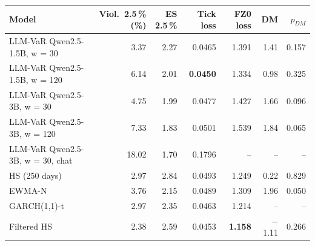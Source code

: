 \begin{tabular}{lrrrrrr}
\toprule
Model & Viol.\ 2.5\,\% (\%) & ES 2.5\,\% & Tick loss & FZ0 loss & DM & $p_{DM}$ \\
\midrule
LLM-VaR Qwen2.5-1.5B, w = 30 & 3.37 & 2.27 & 0.0465 & 1.391 & 1.41 & 0.157 \\
LLM-VaR Qwen2.5-1.5B, w = 120 & 6.14 & 2.01 & \textbf{0.0450} & 1.334 & 0.98 & 0.325 \\
LLM-VaR Qwen2.5-3B, w = 30 & 4.75 & 1.99 & 0.0477 & 1.427 & 1.66 & 0.096 \\
LLM-VaR Qwen2.5-3B, w = 120 & 7.33 & 1.83 & 0.0501 & 1.539 & 1.84 & 0.065 \\
LLM-VaR Qwen2.5-3B, w = 30, chat & 18.02 & 1.70 & 0.1796 & -- & -- & -- \\
HS (250 days) & 2.97 & 2.84 & 0.0493 & 1.249 & 0.22 & 0.829 \\
EWMA-N & 3.76 & 2.15 & 0.0489 & 1.309 & 1.96 & 0.050 \\
GARCH(1,1)-t & 2.97 & 2.35 & 0.0463 & 1.214 & -- & -- \\
Filtered HS & 2.38 & 2.59 & 0.0453 & \textbf{1.158} & $-$1.11 & 0.266 \\
\bottomrule
\end{tabular}
